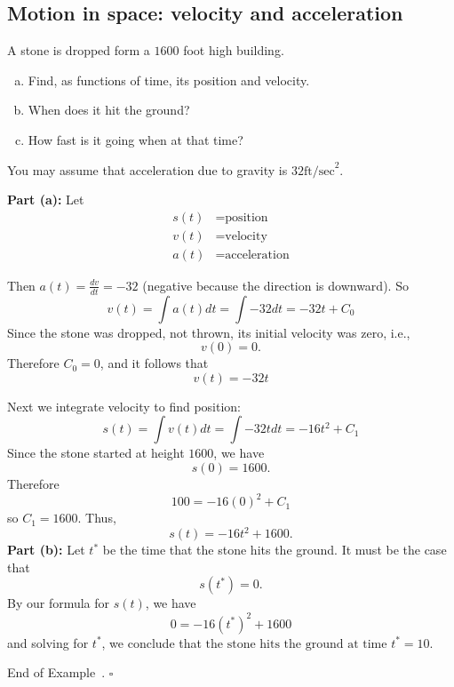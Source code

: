 \documentclass[10pt]{article}
\theoremstyle{definition}
\newtheorem{example}[theorem]{Example}
\renewenvironment{example}
{\begin{oldexample}}
  {\par\smallskip\hfill   End of Example~\theexample. $\square$    \par\end{oldexample}}
\newcommand{\fl}{\noindent\textbf} %
\newcommand{\1}[1]{\textbf{1}_{\left[#1\right]}} %
\begin{document}
\subsection{Motion in space: velocity and acceleration}
\begin{example}
  A stone  is dropped form a $1600$ foot high building.
  \begin{enumerate}[(a)]
    \item Find, as functions of time, its position and velocity.
    \item When does it hit the ground?
    \item How fast is it going when at that time?
  \end{enumerate}
  You may assume that acceleration due to gravity is $32 \mbox{ft/sec}^{2}$.

  \fl{Part (a):} Let
  \begin{align*}
    s(t)&=\mbox{position}\\
    v(t)&=\mbox{velocity}\\
    a(t)&=\mbox{acceleration}
  \end{align*}

  Then $a(t) = \frac{dv}{dt} = -32$ (negative because the direction is downward). So
  \begin{equation*}
    v(t) = \int a(t) dt = \int -32 dt = -32t +C_{0}
  \end{equation*}
  Since the stone was dropped, not thrown, its initial velocity was zero, i.e.,
  \begin{equation*}
    v(0) = 0.
  \end{equation*}
  Therefore $C_{0} =0$, and it follows that
  \begin{equation*}
    \boxed{v(t) = -32t}
  \end{equation*}

  Next we integrate velocity to find position:
  \begin{equation*}
    s(t) = \int v(t)dt = \int -32t dt = -16t^{2}+C_{1}
  \end{equation*}
  Since the stone started at height $1600$, we have
  \begin{equation*}
    s(0) = 1600.
  \end{equation*}
  Therefore
  \begin{equation*}
    100 = -16(0)^{2}+C_{1}
  \end{equation*}
  so $C_{1} = 1600$.
  Thus,
  \begin{equation*}
    \boxed{s(t) = -16t^{2}+1600.}
  \end{equation*}
  \fl{Part (b):} Let $t^{*}$ be the time that the stone hits the ground. It must be the case that
  \begin{equation*}
    s(t^{*}) = 0.
  \end{equation*}
  By our formula for $s(t)$, we have
  \begin{equation*}
    0 = -16(t^{*})^{2}+1600
  \end{equation*}
  and solving for $t^{*}$, we conclude that $\boxed{\text{the stone hits the ground at time } t^{*} =10}$.


\end{example}
\end{document}
